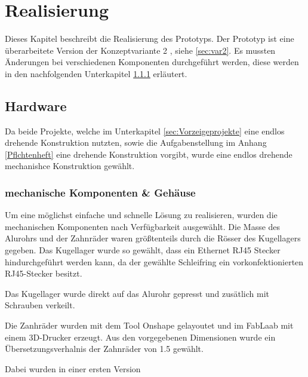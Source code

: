 \chapter{Realisierung}
\label{chap:Realisierung}

Dieses Kapitel beschreibt die Realisierung des Prototyps. Der Prototyp ist eine überarbeitete Version der Konzeptvariante 2 , siehe \ref{sec:var2}. Es mussten Änderungen bei verschiedenen Komponenten durchgeführt werden, diese werden in den nachfolgenden Unterkapitel \ref{sec:mechKomp} erläutert. 


\section {Hardware}
\label{sec:Hardware}

Da beide Projekte, welche im Unterkapitel \ref{sec:Vorzeigeprojekte} eine endlos drehende Konstruktion nutzten, sowie die Aufgabenstellung im Anhang \ref{Pflchtenheft} eine drehende Konstruktion vorgibt, wurde eine endlos drehende mechanishce Konstruktion gewählt. 

\subsection {mechanische Komponenten \& Gehäuse}
\label{sec:mechKomp}


Um eine möglichst einfache und schnelle Lösung zu realisieren, wurden die mechanischen Komponenten nach Verfügbarkeit ausgewählt. Die Masse des Alurohrs und der Zahnräder waren größtenteils durch die Rösser des Kugellagers gegeben. Das Kugellager wurde so gewählt, dass ein Ethernet RJ45 Stecker hindurchgeführt werden kann, da der gewählte Schleifring ein vorkonfektionierten RJ45-Stecker besitzt.

Das Kugellager wurde direkt auf das Alurohr gepresst und zusätlich mit Schrauben verkeilt.

Die Zanhräder wurden mit dem Tool Onshape gelayoutet und im FabLaab mit einem 3D-Drucker erzeugt. Aus den vorgegebenen Dimensionen wurde ein Übersetzungsverhalnis der Zahnräder von 1.5 gewählt. 

Dabei wurden in einer ersten Version 

